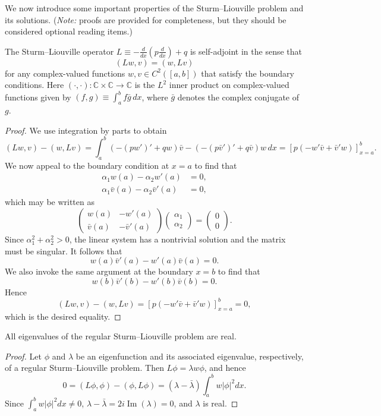 We now introduce some important properties of the Sturm--Liouville problem and its solutions. (\textit{Note:} proofs are provided for completeness, but they should be considered optional reading items.)

\begin{theorem}
    The Sturm--Liouville operator $L \equiv -\frac{d}{dx}(p \frac{d}{dx}) + q$ is self-adjoint in the sense that
    \[(Lw, v) = (w, Lv)\]
    for any complex-valued functions $w, v \in C^2([a, b])$ that satisfy the boundary conditions. Here $(\cdot, \cdot) : \mathbb{C} \times \mathbb{C} \to \mathbb{C}$ is the $L^2$ inner product on complex-valued functions given by $(f, g) \equiv \int_a^b f \bar{g}\,dx$, where $\bar{g}$ denotes the complex conjugate of $g$.
\end{theorem}
\begin{proof}
    We use integration by parts to obtain
    \[(Lw, v) - (w, Lv) = \int_a^b (-(pw')' + qw)\bar{v} - (-(p\bar{v}')' + q\bar{v}) w\,dx = [p(-w'\bar{v} + \bar{v}'w)]_{x=a}^{b}.\]
    We now appeal to the boundary condition at $x = a$ to find that
    \begin{align*}
        \alpha_1 w(a) - \alpha_2 w'(a) &= 0, \\
        \alpha_1 \bar{v}(a) - \alpha_2 \bar{v}'(a) &= 0,
    \end{align*}
    which may be written as
    \[\begin{pmatrix} w(a) & -w'(a) \\ \bar{v}(a) & -\bar{v}'(a) \end{pmatrix} \begin{pmatrix} \alpha_1 \\ \alpha_2 \end{pmatrix} = \begin{pmatrix} 0 \\ 0 \end{pmatrix}.\]
    Since $\alpha_1^2 + \alpha_2^2 > 0$, the linear system has a nontrivial solution and the matrix must be singular. It follows that
    \[w(a)\bar{v}'(a) - w'(a)\bar{v}(a) = 0.\]
    We also invoke the same argument at the boundary $x = b$ to find that
    \[w(b)\bar{v}'(b) - w'(b)\bar{v}(b) = 0.\]
    Hence
    \[(Lw, v) - (w, Lv) = [p(-w'\bar{v} + \bar{v}'w)]_{x=a}^{b} = 0,\]
    which is the desired equality.
\end{proof}

\begin{theorem}
    All eigenvalues of the regular Sturm--Liouville problem are real.
\end{theorem}
\begin{proof}
    Let $\phi$ and $\lambda$ be an eigenfunction and its associated eigenvalue, respectively, of a regular Sturm--Liouville problem. Then $L\phi = \lambda w \phi$, and hence
    \[0 = (L\phi, \phi) - (\phi, L\phi) = (\lambda - \bar{\lambda}) \int_a^b w |\phi|^2 dx.\]
    Since $\int_a^b w |\phi|^2 dx \neq 0$, $\lambda - \bar{\lambda} = 2i \operatorname{Im}(\lambda) = 0$, and $\lambda$ is real.
\end{proof}

